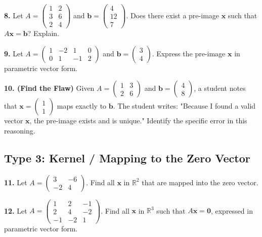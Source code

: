 \documentclass{article}
\begin{document}
\vspace{0.3cm}
\textbf{8.} Let $A = \begin{pmatrix} 1 & 2 \\ 3 & 6 \\ 2 & 4 \end{pmatrix}$ and $\mathbf{b} = \begin{pmatrix} 4 \\ 12 \\ 7 \end{pmatrix}$. Does there exist a pre-image $\mathbf{x}$ such that $A\mathbf{x} = \mathbf{b}$? Explain.

\vspace{0.3cm}
\textbf{9.} Let $A = \begin{pmatrix} 1 & -2 & 1 & 0 \\ 0 & 1 & -1 & 2 \end{pmatrix}$ and $\mathbf{b} = \begin{pmatrix} 3 \\ 4 \end{pmatrix}$. Express the pre-image $\mathbf{x}$ in parametric vector form.

\vspace{0.3cm}
\textbf{10. (Find the Flaw)} Given $A = \begin{pmatrix} 1 & 3 \\ 2 & 6 \end{pmatrix}$ and $\mathbf{b} = \begin{pmatrix} 4 \\ 8 \end{pmatrix}$, a student notes that $\mathbf{x} = \begin{pmatrix} 1 \\ 1 \end{pmatrix}$ maps exactly to $\mathbf{b}$. The student writes: "Because I found a valid vector $\mathbf{x}$, the pre-image exists and is unique." Identify the specific error in this reasoning.

\subsection*{Type 3: Kernel / Mapping to the Zero Vector}
\textbf{11.} Let $A = \begin{pmatrix} 3 & -6 \\ -2 & 4 \end{pmatrix}$. Find all $\mathbf{x}$ in $\mathbb{R}^2$ that are mapped into the zero vector. 

\vspace{0.3cm}
\textbf{12.} Let $A = \begin{pmatrix} 1 & 2 & -1 \\ 2 & 4 & -2 \\ -1 & -2 & 1 \end{pmatrix}$. Find all $\mathbf{x}$ in $\mathbb{R}^3$ such that $A\mathbf{x} = \mathbf{0}$, expressed in parametric vector form.
\end{document}
